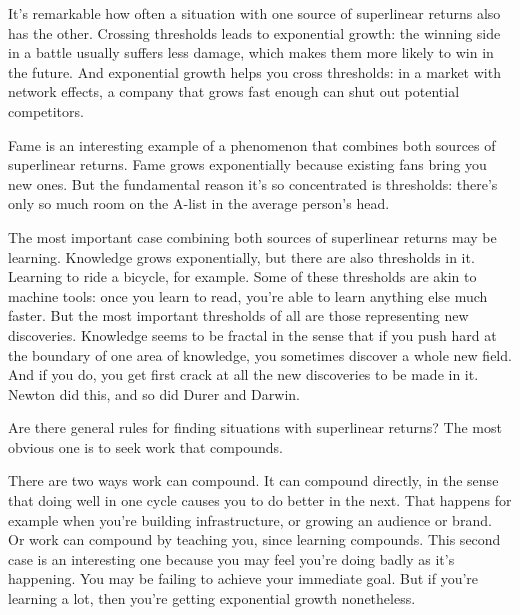 It's
                  remarkable how often a situation with one source of
                  superlinear returns also has the other. Crossing thresholds
                  leads to exponential growth: the winning side in a battle
                  usually suffers less damage, which makes them more likely to
                  win in the future. And exponential growth helps you cross
                  thresholds: in a market with network effects, a company that
                  grows fast enough can shut out potential competitors.

Fame
                  is an interesting example of a phenomenon that combines both
                  sources of superlinear returns. Fame grows exponentially
                  because existing fans bring you new ones. But the fundamental
                  reason it's so concentrated is thresholds: there's only so
                  much room on the A-list in the average person's head.

The
                  most important case combining both sources of superlinear
                  returns may be learning. Knowledge grows exponentially, but
                  there are also thresholds in it. Learning to ride a bicycle,
                  for example. Some of these thresholds are akin to machine
                  tools: once you learn to read, you're able to learn anything
                  else much faster. But the most important thresholds of all are
                  those representing new discoveries. Knowledge seems to be
                  fractal in the sense that if you push hard at the boundary of
                  one area of knowledge, you sometimes discover a whole new
                  field. And if you do, you get first crack at all the new
                  discoveries to be made in it. Newton did this, and so did
                  Durer and Darwin.






                  Are there general rules for finding situations with
                  superlinear returns? The most obvious one is to seek work that
                  compounds.

There are two ways work can compound. It
                  can compound directly, in the sense that doing well in one
                  cycle causes you to do better in the next. That happens for
                  example when you're building infrastructure, or growing an
                  audience or brand. Or work can compound by teaching you, since
                  learning compounds. This second case is an interesting one
                  because you may feel you're doing badly as it's happening. You
                  may be failing to achieve your immediate goal. But if you're
                  learning a lot, then you're getting exponential growth
                  nonetheless.

